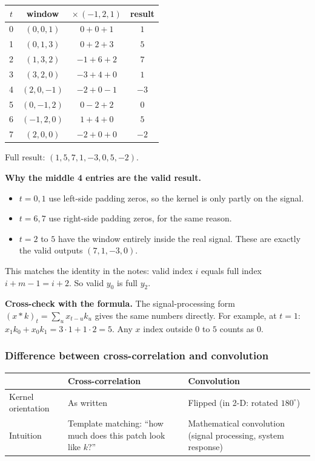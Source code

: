 \begin{center}
\begin{tabular}{cccc}
\toprule
$t$ & window & $\times\,(-1, 2, 1)$ & result \\
\midrule
0 & $(0, 0, 1)$   & $0 + 0 + 1$  & $1$ \\
1 & $(0, 1, 3)$   & $0 + 2 + 3$  & $5$ \\
2 & $(1, 3, 2)$   & $-1 + 6 + 2$ & $7$ \\
3 & $(3, 2, 0)$   & $-3 + 4 + 0$ & $1$ \\
4 & $(2, 0, -1)$  & $-2 + 0 - 1$ & $-3$ \\
5 & $(0, -1, 2)$  & $0 - 2 + 2$  & $0$ \\
6 & $(-1, 2, 0)$  & $1 + 4 + 0$  & $5$ \\
7 & $(2, 0, 0)$   & $-2 + 0 + 0$ & $-2$ \\
\bottomrule
\end{tabular}
\end{center}

Full result: $(1, 5, 7, 1, -3, 0, 5, -2)$.

\textbf{Why the middle 4 entries are the valid result.}
\begin{itemize}
  \item $t = 0, 1$ use left-side padding zeros, so the kernel is only partly on the signal.
  \item $t = 6, 7$ use right-side padding zeros, for the same reason.
  \item $t = 2$ to $5$ have the window entirely inside the real signal. These are exactly the valid outputs $(7, 1, -3, 0)$.
\end{itemize}
This matches the identity in the notes: valid index $i$ equals full index $i + m - 1 = i + 2$. So valid $y_0$ is full $y_2$.

\textbf{Cross-check with the formula.} The signal-processing form $(x * k)_t = \sum_u x_{t-u} k_u$ gives the same numbers directly. For example, at $t = 1$: $x_1 k_0 + x_0 k_1 = 3\cdot 1 + 1\cdot 2 = 5$. Any $x$ index outside $0$ to $5$ counts as $0$.

\subsubsection*{Difference between cross-correlation and convolution}

\begin{center}
\begin{tabular}{p{}p{}p{}}
\toprule
 & \textbf{Cross-correlation} & \textbf{Convolution} \\
\midrule
Kernel orientation & As written & Flipped (in 2-D: rotated $180^\circ$) \\
Intuition & Template matching: ``how much does this patch look like $k$?'' & Mathematical convolution (signal processing, system response) \\
\bottomrule
\end{tabular}
\end{center}

